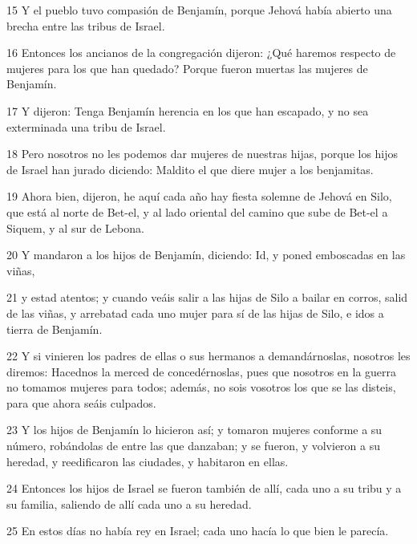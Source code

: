 \par 15 Y el pueblo tuvo compasión de Benjamín, porque Jehová había abierto una brecha entre las tribus de Israel.
\par 16 Entonces los ancianos de la congregación dijeron: ¿Qué haremos respecto de mujeres para los que han quedado? Porque fueron muertas las mujeres de Benjamín.
\par 17 Y dijeron: Tenga Benjamín herencia en los que han escapado, y no sea exterminada una tribu de Israel.
\par 18 Pero nosotros no les podemos dar mujeres de nuestras hijas, porque los hijos de Israel han jurado diciendo: Maldito el que diere mujer a los benjamitas. 
\par 19 Ahora bien, dijeron, he aquí cada año hay fiesta solemne de Jehová en Silo, que está al norte de Bet-el, y al lado oriental del camino que sube de Bet-el a Siquem, y al sur de Lebona.
\par 20 Y mandaron a los hijos de Benjamín, diciendo: Id, y poned emboscadas en las viñas,
\par 21 y estad atentos; y cuando veáis salir a las hijas de Silo a bailar en corros, salid de las viñas, y arrebatad cada uno mujer para sí de las hijas de Silo, e idos a tierra de Benjamín.
\par 22 Y si vinieren los padres de ellas o sus hermanos a demandárnoslas, nosotros les diremos: Hacednos la merced de concedérnoslas, pues que nosotros en la guerra no tomamos mujeres para todos; además, no sois vosotros los que se las disteis, para que ahora seáis culpados.
\par 23 Y los hijos de Benjamín lo hicieron así; y tomaron mujeres conforme a su número, robándolas de entre las que danzaban; y se fueron, y volvieron a su heredad, y reedificaron las ciudades, y habitaron en ellas.
\par 24 Entonces los hijos de Israel se fueron también de allí, cada uno a su tribu y a su familia, saliendo de allí cada uno a su heredad.
\par 25 En estos días no había rey en Israel; cada uno hacía lo que bien le parecía.

